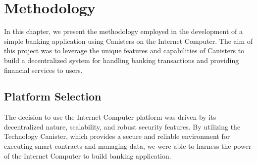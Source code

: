 \chapter{Methodology}\label{chap:concl}
In this chapter, we present the methodology employed in the development of a simple banking application using Canisters on the Internet Computer. The aim of this project was to leverage the unique features and capabilities of Canisters to build a decentralized system for handling banking transactions and providing financial services to users.

\section{Platform Selection}
The decision to use the Internet Computer platform was driven by its decentralized nature, scalability, and robust security features. By utilizing the Technology Canister, which provides a secure and reliable environment for executing smart contracts and managing data, we were able to harness the power of the Internet Computer to build banking application. 

